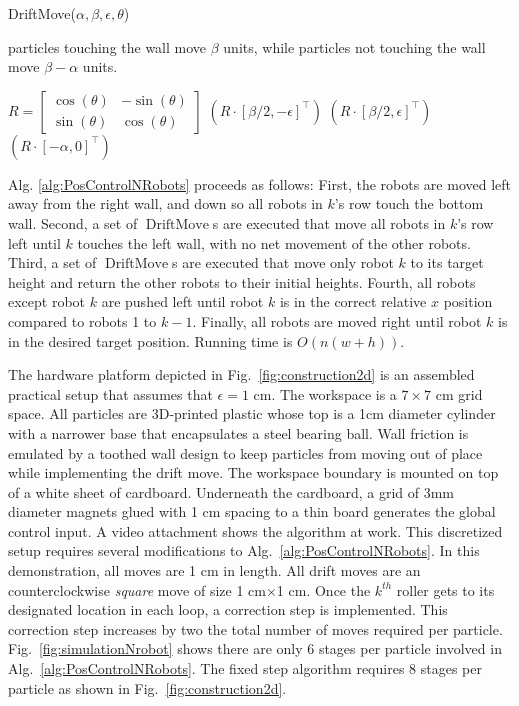 \begin{algorithm}
\caption{ {\sc DriftMove}($\alpha,\beta,\epsilon,\theta$)
}\label{alg:DriftMove}
particles touching the wall move $\beta$ units, while particles not touching the wall move $\beta-\alpha$ units.
\begin{algorithmic}[1]
\State $R = \begin{bmatrix} \cos(\theta) & -\sin(\theta) \\
 \sin(\theta) & \cos(\theta)  \end{bmatrix}$
$(R \cdot [\beta/2,-\epsilon]^\top)$ 
$(R \cdot [\beta/2,\epsilon]^\top)$ 
$(R \cdot [-\alpha,0]^\top)$ 
\end{algorithmic}
\end{algorithm}


Alg. \ref{alg:PosControlNRobots} proceeds as follows:  
First, the robots are moved left away from the right wall, and down so all robots in $k$'s row touch the bottom wall.
Second, a set of $\operatorname{DriftMove}$s are executed that move all robots in $k$'s row left until $k$ touches the left wall, with no net movement of the other robots.
Third, a set of $\operatorname{DriftMove}$s are executed that move only robot $k$ to its target height and return the other robots to their initial heights. 
Fourth, all robots except robot $k$ are pushed left until robot $k$ is in the correct relative $x$ position compared to robots 1 to $k-1$.
Finally, all robots are moved right until robot $k$ is in the desired target position. Running time is $O(n(w+h))$.



The hardware platform depicted in Fig.~\ref{fig:construction2d} is an assembled practical setup that assumes that $\epsilon= 1$ cm. 
The workspace is a $7\times 7$ cm grid space. 
All particles are 3D-printed plastic whose top is a 1cm diameter cylinder with a narrower base that encapsulates a steel bearing ball.
Wall friction is emulated by a toothed wall design to keep particles from moving out of place while implementing the drift move. 
The workspace boundary is mounted on top of a white sheet of cardboard.
Underneath the cardboard, a grid of 3mm diameter magnets glued with 1 cm spacing to a thin board generates the global control input.
 A video attachment  shows the algorithm at work. 
This discretized setup requires several modifications to Alg.~\ref{alg:PosControlNRobots}.
 In this demonstration, all moves are 1 cm in length.
   All drift moves are an counterclockwise \emph{square} move  of size 1 cm$\times$1 cm. 
   Once the $k^{th}$ roller gets to its designated location in each loop, a correction step is implemented. 
   This correction step increases by two the total number of moves required per particle.
   Fig.~\ref{fig:simulationNrobot} shows there are only 6 stages per particle involved in Alg.~\ref{alg:PosControlNRobots}.
The fixed step algorithm requires 8 stages per particle as shown in Fig.~\ref{fig:construction2d}. 

